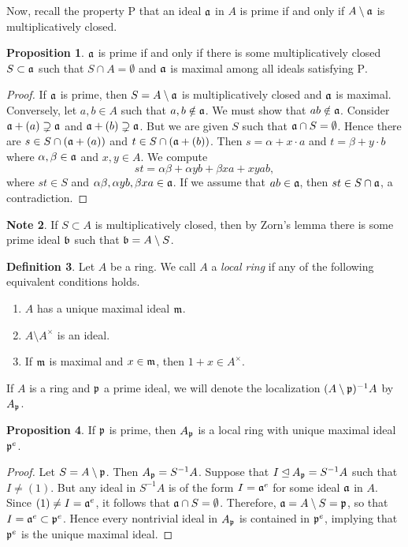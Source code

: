 \documentclass[10pt,letterpaper,cm]{nupset}
\theoremstyle{definition}
\newtheorem{definition}{Definition}[subsection]
\newtheorem{note}[definition]{Note}
\theoremstyle{theorem}
\newtheorem{prop}[definition]{Proposition}
\theoremstyle{remark}
\newcommand{\1}{\mathbf{1}}
\newcommand{\p}{\frak{p}}
\newcommand{\0}{\vec 0}
\newcommand{\Rho}{\mathrm{P}}
\begin{document}
\smallskip

 Now, recall the property $\Rho$ that an ideal $\frak{a}$ in $A$ is prime if and only if $A\setminus  \frak{a}$ is multiplicatively closed. 
 \begin{prop}
  $\frak{a}$ is prime if and only if there is some multiplicatively closed $S\subset \frak{a}$ such that $S \cap A = \emptyset$ and $\frak{a}$ is maximal among all ideals satisfying $\Rho$.
  \end{prop}
\begin{proof}
If $\frak{a}$ is prime, then $S=A \setminus \frak{a}$ is multiplicatively closed and $\frak{a}$ is maximal.
Conversely, let $a,b \in A$ such that $a,b \notin \frak{a}$. We must show that $ab \notin \frak{a}$. Consider $\frak{a} +(a) \supsetneq \frak{a}$ and $\frak{a} +(b) \supsetneq \frak{a}$. But we are given $S$ such that $\frak{a} \cap S = \emptyset$. Hence there are $s\in S \cap (\frak{a} +(a))$ and $t\in S \cap (\frak{a} +(b))$.   Then $s = \alpha + x \cdot a $ and $t= \beta + y \cdot b$ where $\alpha, \beta \in \frak{a}$ and $x,y\in A$. We compute $$  st = \alpha \beta + \alpha y b + \beta x a + xyab , $$ where $st\in S$ and $\alpha \beta, \alpha y b, \beta x a  \in \frak{a}$.  If we assume that $ab\in \frak{a}$, then $st\in S \cap \frak{a}$, a contradiction. 
\end{proof}


\begin{note}
 If $S\subset A$ is multiplicatively closed, then by Zorn's lemma there is some prime ideal $\frak{b}$ such that $\frak{b} = A \setminus S$.
 \end{note}

\begin{definition}
Let $A$ be a ring. We call $A$ a \textit{local ring} if any of the following equivalent conditions holds.
\begin{enumerate}[label=(\alph*)]
\item $A$ has a unique maximal ideal $\frak{m}$.
\item $A \setminus A^{\times}$ is an ideal.
\item If $\frak{m}$ is maximal and $x\in \frak{m}$, then $1+x \in A^{\times}$. 
\end{enumerate}
If $A$ is a ring and $\p$ a prime ideal, we will denote the localization $(A\setminus \p)^{-1}A $ by $A_{\p}$. 
\end{definition}

\begin{prop}
 If $\p$ is prime, then $A_{\p}$ is a local ring with unique maximal ideal $\p^e$.
\end{prop}
\begin{proof}
Let $S = A \setminus \p$. Then $A_{\p} = S^{-1}A$. Suppose that $I \unlhd A_{\p} = S^{-1}A$  such that $I \ne (1)$. But any ideal in $S^{-1}A$ is of the form $I = \frak{a}^e$ for some ideal $\frak{a}$ in $A$. Since $(1) \ne I = \frak{a}^e$, it follows that $\frak{a} \cap S = \emptyset$. Therefore, $\frak{a} = A \setminus S = \p$, so that $I= \frak{a}^e \subset \p^e$. Hence every nontrivial ideal in $A_{\p}$ is contained in $\p^e$, implying that $\p^e$ is the unique maximal ideal. 
\end{proof}
\end{document}
